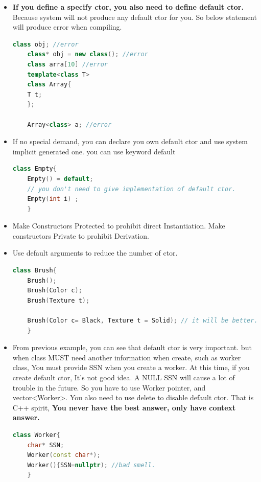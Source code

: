 \documentclass[a4paper,12pt,twoside]{book}
\begin{document}
\begin{itemize}
	\item \textbf{If you define a specify ctor, you also need to define default ctor.} Because system will not produce any default ctor for you. So below statement will produce error when compiling.
	\begin{lstlisting}[frame=single, language=c++]
	class obj; //error
	class* obj = new class(); //error
	class arra[10] //error
	template<class T>
	class Array{
	T t;
	};
	
	Array<class> a; //error
	\end{lstlisting}
	
	\item If no special demand, you can declare you own default ctor and use system implicit generated one. you can use keyword default
	\begin{lstlisting}[frame=single, language=c++]
	class Empty{
	Empty() = default;
	// you don't need to give implementation of default ctor.
	Empty(int i) ;
	}
	\end{lstlisting}
	
	
	\item Make Constructors Protected to prohibit direct Instantiation. Make constructors Private to prohibit Derivation.
	
	\item Use default arguments to reduce the number of ctor.
	\begin{lstlisting}[frame=single, language=c++]
	class Brush{
	Brush();
	Brush(Color c);
	Brush(Texture t);
	
	Brush(Color c= Black, Texture t = Solid); // it will be better.
	}
	\end{lstlisting}
	
	
	\item From previous example, you can see that default ctor is very important. but when class MUST need another information when create, such as  worker class, You must provide SSN when you create a worker.
	At this time, if you create default ctor, It's not good idea. A NULL SSN will cause a lot of trouble in the future.  So you have to use Worker pointer, and vector<Worker>.  You also need to use delete to disable default ctor.
	That is C++ spirit, \textbf{You never have the best answer, only have context answer. }
	\begin{lstlisting}[frame=single, language=c++]
	class Worker{
	char* SSN;
	Worker(const char*);
	Worker(){SSN=nullptr); //bad smell.
	}
	\end{lstlisting}
	

\end{itemize}
\end{document}
